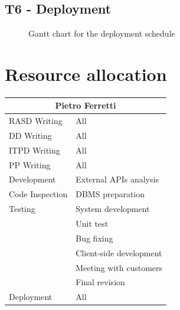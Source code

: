 \documentclass[english]{article}
\begin{document}
\subsection{T6 - Deployment}

\begin{figure}[H]
	\centering
	\caption{Gantt chart for the deployment schedule}
\end{figure}

\section{Resource allocation}

\paragraph{}

\begin{center}
	\begin{tabular}{|p{3cm}|p{4cm}|}
		\hline
		\multicolumn{2}{|c|}{\textbf{Pietro Ferretti}}\\
		\hline
		RASD Writing & All\\
		\hline
		DD Writing & All\\
		\hline
		ITPD Writing & All\\
		\hline
		PP Writing & All\\
		\hline
		Development & External APIs analysis\\
		Code Inspection & DBMS preparation\\
		Testing & System development\\
		& Unit test\\
		& Bug fixing\\
		& Client-side development\\
		& Meeting with customers\\
		& Final revision\\
		\hline
		Deployment & All\\
		\hline		
	\end{tabular}
\end{center}
\end{document}
